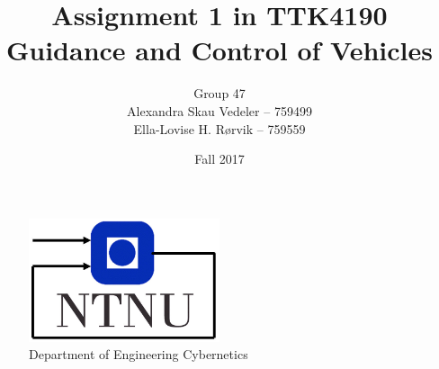 \documentclass[11pt,a4paper,english]{article}
\title{Assignment 1 in TTK4190  \\ Guidance and Control of Vehicles}
\author{Group 47 \\ Alexandra Skau Vedeler -- 759499 
                 \\ Ella-Lovise H. Rørvik --  759559}
\date{Fall 2017}
\begin{document}
\listoftodos 

\begin{titlepage}
    \maketitle
    
    \begin{figure}
    \centering
    \includegraphics[width=0.5\textwidth]{figures/itk_ntnu}\\
    Department of Engineering Cybernetics
    \end{figure}
    \thispagestyle{empty}
\end{titlepage}



\thispagestyle{empty} %

\newpage
\tableofcontents
\thispagestyle{empty} %

\newpage
\setcounter{page}{1}
\setcounter{subsection}{2}

\newpage



%
%

\newpage
{}
\printbibliography
\label{sec:bibliography}
\end{document}
